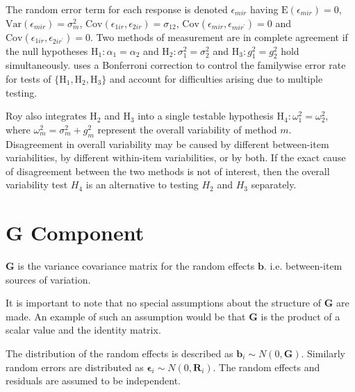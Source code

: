 \documentclass[12pt, a4paper]{report}
\theoremstyle{plain}
\theoremstyle{definition}
\theoremstyle{remark}
\begin{document}
The random error term for each response is denoted $\epsilon_{mir}$ having $\mathrm{E}(\epsilon_{mir})=0$, $\mathrm{Var}(\epsilon_{mir})=\sigma^2_m$, $\mathrm{Cov}(\epsilon_{1ir}, \epsilon_{2 ir})=\sigma_{12}$, $\mathrm{Cov}(\epsilon_{mir}, \epsilon_{mir^\prime})= 0$ and $\mathrm{Cov}(\epsilon_{1ir}, \epsilon_{2 ir^\prime})= 0.$ Two methods of measurement are in complete agreement if the null hypotheses $\mathrm{H}_1\colon \alpha_1 = \alpha_2$ and $\mathrm{H}_2\colon \sigma^2_1 = \sigma^2_2 $ and $\mathrm{H}_3\colon g^2_1= g^2_2$ hold simultaneously. \citet{roy} uses a Bonferroni correction to control the familywise error rate for tests of $\{\mathrm{H}_1, \mathrm{H}_2, \mathrm{H}_3\}$ and account for difficulties arising due to multiple testing. \\
\bigskip

Roy also integrates $\mathrm{H}_2$ and $\mathrm{H}_3$ into a single testable hypothesis $\mathrm{H}_4\colon \omega^2_1=\omega^2_2,$ where $\omega^2_m = \sigma^2_m + g^2_m$ represent the overall variability of method $m.$ \\
\bigskip
Disagreement in overall variability may be caused by different between-item variabilities, by different within-item variabilities, or by both.  If the exact cause of disagreement between the two methods is not of interest, then the overall variability test $H_4$ is an alternative to testing $H_2$ and $H_3$ separately.


\section{G Component}


$\boldsymbol{G}$ is the variance covariance matrix for the random effects $\boldsymbol{b}$.
i.e. between-item sources of variation.  

It is important to note that no special assumptions about the structure of $\boldsymbol{G}$ are made. An example of such an assumption would be that $\boldsymbol{G}$ is the product of a scalar value and the identity matrix.


The distribution of the random effects is described as $\boldsymbol{b}_i \sim N(0,\boldsymbol{G})$. Similarly  random errors are distributed as $\boldsymbol{\epsilon}_i \sim N(0,\boldsymbol{R}_i)$. The random effects and residuals are assumed to be independent.
\end{document}
